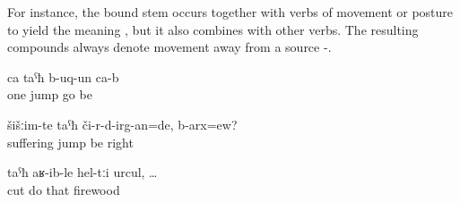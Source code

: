 For instance, the bound stem  occurs together with verbs of movement or posture to yield the meaning , but it also combines with other verbs. The resulting compounds always denote movement away from a source -.
%
\begin{exe}
	\ex	\label{ex:One (boar) jumped (down)}
	\gll	ca	taˁħ	b-uq-un	ca-b\\
		one	jump	go	be\\
	\glt	{}

	\ex	\label{ex:I would distract from the sorrows, right}
	\gll	šišːim-te	taˁħ	či-r-d-irg-an=de,	b-arx=ew?\\
		suffering	jump	be	right\\
	\glt	{}

	\ex	\label{ex:when (they) cut off the wood}
	\gll	taˁħ	aʁ-ib-le	hel-tːi	urcul,	\ldots\\
		cut	do	that	firewood\\
	\glt	{}
\end{exe}

